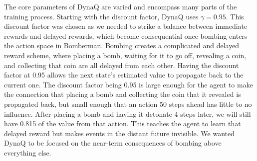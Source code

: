 \documentclass[article, 10pt]{IEEEtran}
\begin{document}
The core parameters of DynaQ are varied and encompass many parts of the training process. Starting with the discount factor, DynaQ uses $\gamma = 0.95$. This discount factor was chosen as we needed to strike a balance between immediate rewards and delayed rewards, which become consequential once bombing enters the action space in Bomberman. Bombing creates a complicated and delayed reward scheme, where placing a bomb, waiting for it to go off, revealing a coin, and collecting that coin are all delayed from each other. Having the discount factor at 0.95 allows the next state's estimated value to propagate back to the current one. The discount factor being 0.95 is large enough for the agent to make the connection that placing a bomb and collecting the coin that it revealed is propagated back, but small enough that an action 50 steps ahead has little to no influence. After placing a bomb and having it detonate 4 steps later, we will still have 0.815 of the value from that action. This teaches the agent to learn that delayed reward but makes events in the distant future invisible. We wanted DynaQ to be focused on the near-term consequences of bombing above everything else. 
\end{document}
